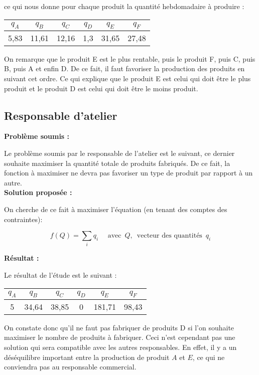 \documentclass[paper=a4, fontsize=11pt]{scrartcl}
\numberwithin{equation}{section}		%
\numberwithin{figure}{section}			%
\numberwithin{table}{section}				%
\renewcommand{\bf}[1]{\textbf{#1}}
\begin{document}
ce qui nous donne pour chaque produit la quantité hebdomadaire à produire :
\begin{center}
\begin{tabular}{cccccc}
\hline
$q_A$ & $q_B$ & $q_C$ & $q_D$ & $q_E$ & $q_F$ \\
\hline
5,83 & 11,61 & 12,16 & 1,3 & 31,65 & 27,48 \\
\hline
\end{tabular}
\end{center}

On remarque que le produit E est le plus rentable, puis le produit F, puis C, puis B, puis A et enfin D. De ce fait, il faut favoriser la production des produits en suivant cet ordre. Ce qui explique que le produit E est celui qui doit être le plus produit et le produit D est celui qui doit être le moins produit.


\subsection{Responsable d'atelier}
\bf{Problème soumis :}

Le problème soumis par le responsable de l'atelier est le suivant, ce dernier souhaite maximiser la quantité totale de produits fabriqués. De ce fait, la fonction à maximiser ne devra pas favoriser un type de produit par rapport à un autre.\\

\bf{Solution proposée :}

On cherche de ce fait à maximiser l'équation (en tenant des comptes des contraintes):

\[f(Q) = \sum_i q_i \quad \text{  avec } \, Q, \, \text{ vecteur des quantités } \, q_i \]

\bf{Résultat :}

Le résultat de l'étude est le suivant : 

\begin{center}
\begin{tabular}{cccccc}
\hline 
$q_A$ & $q_B$ & $q_C$ & $q_D$ & $q_E$ & $q_F$ \\ 
\hline 
5 & 34,64 & 38,85 & 0 & 181,71 & 98,43 \\ 
\hline 
\end{tabular} 
\end{center}

On constate donc qu'il ne faut pas fabriquer de produits D si l'on souhaite maximiser le nombre de produits à fabriquer. Ceci n'est cependant pas une solution qui sera compatible avec les autres responsables. En effet, il y a un déséquilibre important entre la production de produit $A$ et $E$, ce qui ne conviendra pas au responsable commercial.
\end{document}
